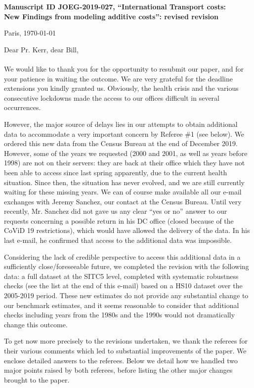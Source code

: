 \documentclass[12pt]{article}
\begin{document}
\noindent \textbf{Manuscript ID JOEG-2019-027, ``International Transport costs:\\New Findings from modeling additive costs'': revised revision}

\bigskip
\bigskip

\hfill Paris, \today

\bigskip
\noindent Dear Pr. Kerr, dear Bill, \\
\\
\noindent \noindent We would like to thank you for the opportunity to resubmit our paper, and for your patience in waiting the outcome. We are very grateful for the deadline extensions you kindly granted us. Obviously, the health crisis and the various consecutive lockdowns made the access to our offices difficult in several occurrences. \medskip

However, the major source of delays lies in our attempts to obtain additional data to accommodate a very important concern by Referee \#1 (see below). We ordered this new data from the Census Bureau at the end of December 2019. However, some of the years we requested (2000 and 2001, as well as years before 1998) are not on their servers: they are back at their office which they have not been able to access since last spring apparently, due to the current health situation. Since then, the situation has never evolved, and we are still currently waiting for these missing years. We can of course make available all our e-mail exchanges with Jeremy Sanchez, our contact at the Census Bureau. Until very recently, Mr. Sanchez did not gave us any clear “yes or no” answer to our requests concerning a possible return in his DC office (closed because of the CoViD 19 restrictions), which would have allowed the delivery of the data. In his last e-mail, he confirmed that access to the additional data was impossible.\medskip

Considering the lack of credible perspective to access this additional data in a sufficiently close/foreseeable future, we completed the revision with the following data: a full dataset at the SITC5 level, completed with systematic robustness checks (see the list at the end of this e-mail) based on a HS10 dataset over the 2005-2019 period. These new estimates do not provide any substantial change to our benchmark estimates, and it seems reasonable to consider that additional checks including years from the 1980s and the 1990s would not dramatically change this outcome. \medskip

To get now more precisely to the revisions undertaken, we thank the referees for their various comments which led to substantial improvements of the paper. We enclose detailed answers to the referees. Below we detail how we handled two major points raised by both referees, before listing the other major changes brought to the paper.
\end{document}
